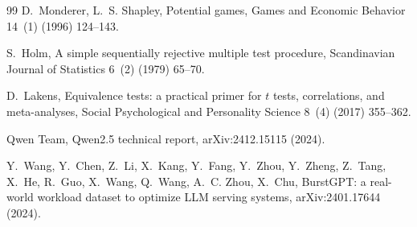 \documentclass[preprint,12pt]{elsarticle}
\begin{document}
\begin{thebibliography}{99}
D.~Monderer, L.~S. Shapley, Potential games, Games and Economic Behavior
14~(1) (1996) 124--143.

S.~Holm, A simple sequentially rejective multiple test procedure,
Scandinavian Journal of Statistics 6~(2) (1979) 65--70.

D.~Lakens, Equivalence tests: a practical primer for $t$ tests,
correlations, and meta-analyses, Social Psychological and Personality
Science 8~(4) (2017) 355--362.

Qwen Team, Qwen2.5 technical report, arXiv:2412.15115 (2024).

Y.~Wang, Y.~Chen, Z.~Li, X.~Kang, Y.~Fang, Y.~Zhou, Y.~Zheng, Z.~Tang,
X.~He, R.~Guo, X.~Wang, Q.~Wang, A.~C. Zhou, X.~Chu, BurstGPT: a real-world workload dataset to optimize LLM
serving systems, arXiv:2401.17644 (2024).

\end{thebibliography}
\end{document}
